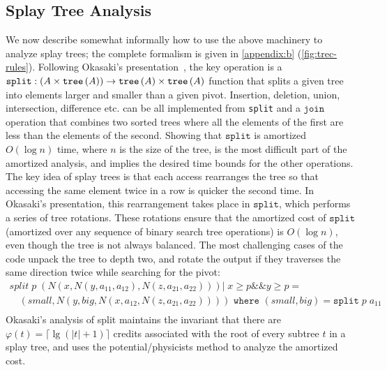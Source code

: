 \subsection{Splay Tree Analysis}
We now describe somewhat informally how to use the above machinery to
analyze splay trees; the complete formalism is given 
in \autoref{appendix:b} (\autoref{fig:trec-rules}).%
Following 
Okasaki's presentation~\cite{okasaki:purely-functional-data-structures},
the key operation is
a $\texttt{split} : (A \times \texttt{tree}\left(A\right)) \to \texttt{tree}\left(A\right) \times \texttt{tree}\left(A\right)$ function that splits a given tree into elements larger and smaller than a given pivot. Insertion, deletion, union, intersection, difference etc. can be all implemented from \texttt{split} and a $\texttt{join}$ operation that combines two sorted trees where all the elements of the first are less than the elements of the second. Showing that $\texttt{split}$ is amortized $O(\log n)$ time, where $n$ is the size of the tree, is the most difficult part of the amortized analysis, and implies the desired time bounds for the other operations.  The key idea of splay trees is that each access rearranges the tree so that accessing the same element twice in a row is quicker the second time. In Okasaki's presentation, this rearrangement takes place in $\texttt{split}$, which performs a series of tree rotations. These rotations ensure that the amortized cost of $\texttt{split}$ (amortized over any sequence of binary search tree operations) is $O(\log n)$, even though the tree is not always balanced.
The most challenging cases of the code unpack the tree to depth two, and rotate the output if they traverses the same direction twice while searching for the pivot:
$$
\begin{array}{l}
split \; p \; (N (x,N (y,a_{11},a_{12}), N (z,a_{21},a_{22}))) | \; x \geq p \mathbin{\&\&} y \geq p = \\
\hspace{1em} (small, N (y,big,N (x,a_{12},N (z,a_{21},a_{22})))) \texttt{ where } (small,big) = \texttt{split} \; p \; a_{11}\\
\end{array}
$$
Okasaki's analysis of split maintains the invariant that there are $\varphi(t) = \lceil{\lg (|t| + 1)}\rceil$ credits associated with the root of every subtree $t$ in a splay tree, and uses the potential/physicists method to analyze the amortized cost.  

